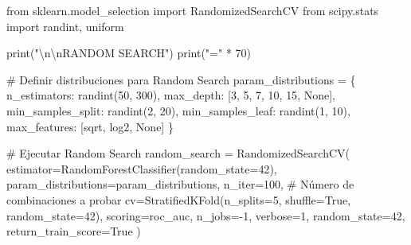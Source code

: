 \documentclass[
  doc,
  floatsintext,
  longtable,
  a4paper,
  nolmodern,
  notxfonts,
  notimes,
  12pt,
  colorlinks=true,linkcolor=blue,citecolor=blue,urlcolor=blue]{apa7}
\newenvironment{Shaded}{\begin{snugshade}}{\end{snugshade}}
\newcommand{\BuiltInTok}[1]{\textcolor[rgb]{0.00,0.23,0.31}{#1}}
\newcommand{\CharTok}[1]{\textcolor[rgb]{0.13,0.47,0.30}{#1}}
\newcommand{\CommentTok}[1]{\textcolor[rgb]{0.37,0.37,0.37}{#1}}
\newcommand{\DecValTok}[1]{\textcolor[rgb]{0.68,0.00,0.00}{#1}}
\newcommand{\ImportTok}[1]{\textcolor[rgb]{0.00,0.46,0.62}{#1}}
\newcommand{\NormalTok}[1]{\textcolor[rgb]{0.00,0.23,0.31}{#1}}
\newcommand{\OperatorTok}[1]{\textcolor[rgb]{0.37,0.37,0.37}{#1}}
\newcommand{\StringTok}[1]{\textcolor[rgb]{0.13,0.47,0.30}{#1}}
\newcommand{\VariableTok}[1]{\textcolor[rgb]{0.07,0.07,0.07}{#1}}
\begin{document}
\begin{Shaded}
\begin{Highlighting}[]
\ImportTok{from}\NormalTok{ sklearn.model\_selection }\ImportTok{import}\NormalTok{ RandomizedSearchCV}
\ImportTok{from}\NormalTok{ scipy.stats }\ImportTok{import}\NormalTok{ randint, uniform}

\BuiltInTok{print}\NormalTok{(}\StringTok{"}\CharTok{\textbackslash{}n\textbackslash{}n}\StringTok{RANDOM SEARCH"}\NormalTok{)}
\BuiltInTok{print}\NormalTok{(}\StringTok{"="} \OperatorTok{*} \DecValTok{70}\NormalTok{)}

\CommentTok{\# Definir distribuciones para Random Search}
\NormalTok{param\_distributions }\OperatorTok{=}\NormalTok{ \{}
    \StringTok{\textquotesingle{}n\_estimators\textquotesingle{}}\NormalTok{: randint(}\DecValTok{50}\NormalTok{, }\DecValTok{300}\NormalTok{),}
    \StringTok{\textquotesingle{}max\_depth\textquotesingle{}}\NormalTok{: [}\DecValTok{3}\NormalTok{, }\DecValTok{5}\NormalTok{, }\DecValTok{7}\NormalTok{, }\DecValTok{10}\NormalTok{, }\DecValTok{15}\NormalTok{, }\VariableTok{None}\NormalTok{],}
    \StringTok{\textquotesingle{}min\_samples\_split\textquotesingle{}}\NormalTok{: randint(}\DecValTok{2}\NormalTok{, }\DecValTok{20}\NormalTok{),}
    \StringTok{\textquotesingle{}min\_samples\_leaf\textquotesingle{}}\NormalTok{: randint(}\DecValTok{1}\NormalTok{, }\DecValTok{10}\NormalTok{),}
    \StringTok{\textquotesingle{}max\_features\textquotesingle{}}\NormalTok{: [}\StringTok{\textquotesingle{}sqrt\textquotesingle{}}\NormalTok{, }\StringTok{\textquotesingle{}log2\textquotesingle{}}\NormalTok{, }\VariableTok{None}\NormalTok{]}
\NormalTok{\}}

\CommentTok{\# Ejecutar Random Search}
\NormalTok{random\_search }\OperatorTok{=}\NormalTok{ RandomizedSearchCV(}
\NormalTok{    estimator}\OperatorTok{=}\NormalTok{RandomForestClassifier(random\_state}\OperatorTok{=}\DecValTok{42}\NormalTok{),}
\NormalTok{    param\_distributions}\OperatorTok{=}\NormalTok{param\_distributions,}
\NormalTok{    n\_iter}\OperatorTok{=}\DecValTok{100}\NormalTok{,  }\CommentTok{\# Número de combinaciones a probar}
\NormalTok{    cv}\OperatorTok{=}\NormalTok{StratifiedKFold(n\_splits}\OperatorTok{=}\DecValTok{5}\NormalTok{, shuffle}\OperatorTok{=}\VariableTok{True}\NormalTok{, random\_state}\OperatorTok{=}\DecValTok{42}\NormalTok{),}
\NormalTok{    scoring}\OperatorTok{=}\StringTok{\textquotesingle{}roc\_auc\textquotesingle{}}\NormalTok{,}
\NormalTok{    n\_jobs}\OperatorTok{={-}}\DecValTok{1}\NormalTok{,}
\NormalTok{    verbose}\OperatorTok{=}\DecValTok{1}\NormalTok{,}
\NormalTok{    random\_state}\OperatorTok{=}\DecValTok{42}\NormalTok{,}
\NormalTok{    return\_train\_score}\OperatorTok{=}\VariableTok{True}
\NormalTok{)}


\end{Highlighting}
\end{Shaded}
\end{document}
